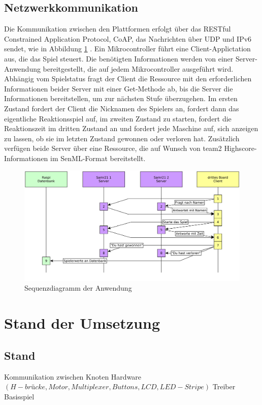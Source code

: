 \documentclass[a4paper]{article}
\begin{document}
  \subsection{Netzwerkkommunikation}
    \label{sec:net}
    Die Kommunikation zwischen den Plattformen erfolgt über das RESTful Constrained
    Application Protocol, CoAP, das Nachrichten über UDP und IPv6 sendet, wie in
    Abbildung \ref{fig:seq_diagram} . Ein Mikrocontroller führt eine
    Client-Applictation aus, die das Spiel steuert. Die benötigten Informationen
    werden von einer Server-Anwendung bereitgestellt, die auf jedem Mikrocontroller
    ausgeführt wird. Abhängig vom Spielstatus fragt der Client die Ressource mit
    den erforderlichen Informationen beider Server mit einer Get-Methode ab, bis
    die Server die Informationen bereitstellen, um zur nächsten Stufe überzugehen.
    Im ersten Zustand fordert der Client die Nicknamen des Spielers an, fordert
    dann das eigentliche Reaktionsspiel auf, im zweiten Zustand zu starten, fordert
    die Reaktionszeit im dritten Zustand an und fordert jede Maschine auf, sich
    anzeigen zu lassen, ob sie im letzten Zustand gewonnen oder verloren hat.
    Zusätzlich verfügen beide Server über eine Ressource, die auf Wunsch von team2
    Highscore-Informationen im SenML-Format bereitstellt.
    \begin{figure}[h]
      \centering
      \includegraphics[scale=0.1]{team1_kommunikation.png}
      \caption{\label{fig:seq_diagram}Sequenzdiagramm der Anwendung}
    \end{figure}

\section{Stand der Umsetzung}
  \label{sec:status}
  \subsection{Stand}
  Kommunikation zwischen Knoten
  Hardware $(H-brücke, Motor, Multiplexer, Buttons, LCD, LED-Stripe )$
  Treiber
  Basisspiel
\end{document}

